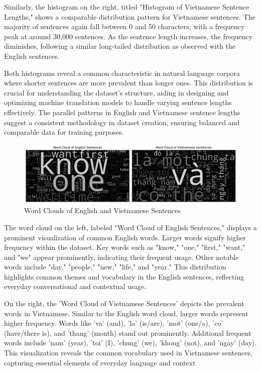 \documentclass{article}
\begin{document}
Similarly, the histogram on the right, titled "Histogram of Vietnamese Sentence Lengths," shows a comparable distribution pattern for Vietnamese sentences. The majority of sentences again fall between 0 and 50 characters, with a frequency peak at around 30,000 sentences. As the sentence length increases, the frequency diminishes, following a similar long-tailed distribution as observed with the English sentences.

Both histograms reveal a common characteristic in natural language corpora where shorter sentences are more prevalent than longer ones. This distribution is crucial for understanding the dataset's structure, aiding in designing and optimizing machine translation models to handle varying sentence lengths effectively. The parallel patterns in English and Vietnamese sentence lengths suggest a consistent methodology in dataset creation, ensuring balanced and comparable data for training purposes.

\begin{figure}[H]
    \centering
    \includegraphics[width=1\textwidth]{figs/wordcloud.png}
    \caption{Word Clouds of English and Vietnamese Sentences}
\end{figure}
The word cloud on the left, labeled "Word Cloud of English Sentences," displays a prominent visualization of common English words. Larger words signify higher frequency within the dataset. Key words such as "know," "one," "first," "want," and "we" appear prominently, indicating their frequent usage. Other notable words include "day," "people," "new," "life," and "year." This distribution highlights common themes and vocabulary in the English sentences, reflecting everyday conversational and contextual usage.

On the right, the 'Word Cloud of Vietnamese Sentences' depicts the prevalent words in Vietnamese. Similar to the English word cloud, larger words represent higher frequency. Words like 'va' (and), 'la' (is/are), 'mot' (one/a), 'co' (have/there is), and 'thang' (month) stand out prominently. Additional frequent words include 'nam' (year), 'toi' (I), 'chung' (we), 'khong' (not), and 'ngay' (day). This visualization reveals the common vocabulary used in Vietnamese sentences, capturing essential elements of everyday language and context
\end{document}
